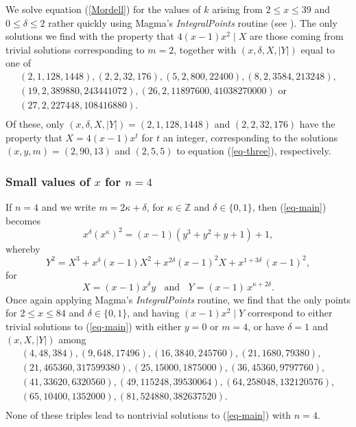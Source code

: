 {We solve equation (\ref{Mordell}) for the values of $k$ arising from $2 \leq x \leq 39$ and $0 \leq \delta \leq 2$ rather quickly using Magma's {\it IntegralPoints} routine (see \cite{magma}). The only solutions we find with the property that $4 (x-1) x^2 \mid X$ are those coming from trivial solutions corresponding to $m =2$, together with $(x,\delta,X,|Y|)$ equal to one of
$$
\begin{array}{c}
(2,1,128,1448), (2,2,32,176), (5,2,800,22400), (8,2,3584,213248),  \\
(19,2,389880,243441072), (26,2,11897600,41038270000) \mbox{ or } \\
(27,2,227448,108416880). \\
\end{array}
$$
Of these, only  $(x,\delta,X,|Y|)=(2,1,128,1448)$ and $(2,2,32,176)$ have the property that $X= 4 (x-1) x^{t}$ for $t$ an integer, corresponding to  the solutions $(x,y,m)=(2,90,13)$ and $(2,5,5)$ to equation (\ref{eq-three}), respectively.


 \subsubsection{Small values of $x$ for $n=4$}

 If $n=4$ and we write $m=2 \kappa + \delta$, for $\kappa \in\mathbb{Z}$ and $\delta \in \{ 0, 1 \}$, then (\ref{eq-main}) becomes
 $$
 x^\delta (x^\kappa)^2 = (x-1) ( y^3+y^2+y+1) + 1,
 $$
 whereby
 $$
 Y^2 = X^3 + x^\delta (x-1)X^2 + x^{2 \delta} (x-1)^2 X + x^{1+3 \delta} \, (x-1)^2,
 $$
for
 $$
 X=(x-1) x^\delta y \; \; \mbox{ and } \; \;  Y=(x-1) \, x^{\kappa+2 \delta}.
 $$
 Once again applying Magma's {\it IntegralPoints} routine, we find that the only points for $2 \leq x \leq 84$ and $\delta \in \{0, 1 \}$, and having $(x-1) x^2 \mid Y$ correspond to either trivial solutions to (\ref{eq-main}) with either $y=0$ or $m=4$, or have $\delta=1$ and  $(x,X,|Y|)$ among
 $$
 \begin{array}{c}
 (4,48,384), (9,648,17496), (16,3840,245760), (21,1680,79380), \\
(21,465360,317599380), (25,15000,1875000), (36,45360,9797760), \\
(41,33620,6320560), (49,115248,39530064), (64,258048,132120576), \\
(65,10400,1352000), (81,524880,382637520). \\
\end{array}
 $$
None of these triples lead to nontrivial solutions to (\ref{eq-main}) with $n=4$.
 
}
